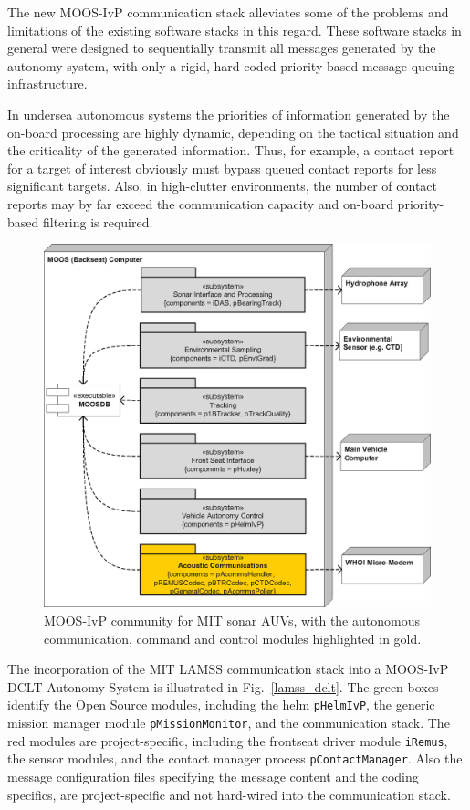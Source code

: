 \documentclass[11pt, letterpaper, oneside]{memoir}
\begin{document}
The new MOOS-IvP communication stack alleviates some of the problems and limitations of the
existing software stacks in this regard. These software stacks in general were designed to
sequentially transmit all messages generated by the autonomy system,
with only a rigid, hard-coded priority-based message queuing
infrastructure.

In undersea autonomous systems the priorities of information generated
by the on-board processing are highly dynamic, depending on the
tactical situation and the criticality of the generated
information. Thus, for example, a contact report for a target of
interest obviously must bypass queued contact reports for less
significant targets. Also, in high-clutter environments, the number of
contact reports may by far exceed the communication capacity and on-board
priority-based filtering is required.

\begin{figure}[htp]
\centering \includegraphics[width=\linewidth]{auv_community.eps}
\caption{MOOS-IvP community for MIT sonar AUVs, with the autonomous
  communication, command and control modules highlighted in
  gold. }
\label{fig:moos_comms}
\end{figure}

The incorporation of the MIT LAMSS communication stack into a MOOS-IvP
DCLT Autonomy System is illustrated in Fig.~\ref{lamss_dclt}. The
green boxes identify the Open Source modules, including the helm \verb|pHelmIvP|, the generic mission manager module \verb|pMissionMonitor|,
and the communication stack. The red modules are project-specific,
including the frontseat driver module \verb|iRemus|, the sensor
modules, and the contact manager process \verb|pContactManager|. Also
the message configuration files specifying the message content and the
coding specifics, are project-specific and not hard-wired into the
communication stack.
\end{document}
